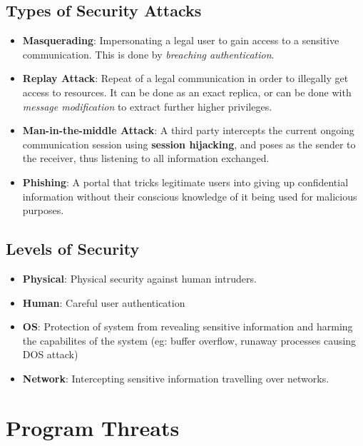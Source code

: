 \documentclass{article}
\theoremstyle{plain}
\theoremstyle{definition}
\begin{document}
\subsection{Types of Security Attacks}
\begin{itemize}
    \item \textbf{Masquerading}: Impersonating a legal user to gain access to a sensitive communication. This is done by \textit{breaching authentication}. 
    
    \item \textbf{Replay Attack}: Repeat of a legal communication in order to illegally get access to resources. It can be done as an exact replica, or can be done with \textit{message modification} to extract further higher privileges. 
    
    \item \textbf{Man-in-the-middle Attack}: A third party intercepts the current ongoing communication session using \textbf{session hijacking}, and poses as the sender to the receiver, thus listening to all information exchanged. 
    
    \item \textbf{Phishing}: A portal that tricks legitimate users into giving up confidential information without their conscious knowledge of it being used for malicious purposes. 
\end{itemize}

\subsection{Levels of Security}
\begin{itemize}
    \item \textbf{Physical}: Physical security against human intruders. 
    
    \item \textbf{Human}: Careful user authentication
    
    \item \textbf{OS}: Protection of system from revealing sensitive information and harming the capabilites of the system (eg: buffer overflow, runaway processes causing DOS attack)
    
    \item \textbf{Network}: Intercepting sensitive information travelling over networks. 
\end{itemize}

\section{Program Threats}
\end{document}
